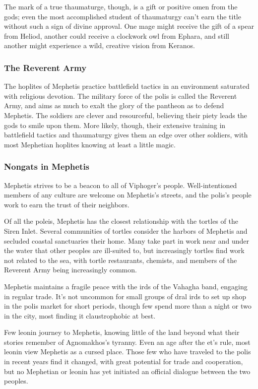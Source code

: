         The mark of a true thaumaturge, though, is a gift or positive omen from the gods; even the most accomplished student of thaumaturgy can't earn the title without such a sign of divine approval.
        One mage might receive the gift of a spear from Heliod, another could receive a clockwork owl from Ephara, and still another might experience a wild, creative vision from Keranos.

    \subsubsection{The Reverent Army}
        The hoplites of Mephetis practice battlefield tactics in an environment saturated with religious devotion.
        The military force of the polis is called the Reverent Army, and aims as much to exalt the glory of the pantheon as to defend Mephetis.
        The soldiers are clever and resourceful, believing their piety leads the gods to smile upon them.
        More likely, though, their extensive training in battlefield tactics and thaumaturgy gives them an edge over other soldiers, with most Mephetian hoplites knowing at least a little magic.

    \subsubsection{Nongats in Mephetis}
        Mephetis strives to be a beacon to all of Viphoger's people.
        Well-intentioned members of any culture are welcome on Mephetis's streets, and the polis's people work to earn the trust of their neighbors.

        Of all the poleis, Mephetis has the closest relationship with the tortles of the Siren Inlet.
        Several communities of tortles consider the harbors of Mephetis and secluded coastal sanctuaries their home.
        Many take part in work near and under the water that other peoples are ill-suited to, but increasingly tortles find work not related to the sea, with tortle restaurants, chemists, and members of the Reverent Army being increasingly common.

        Mephetis maintains a fragile peace with the irds of the Vahagha band, engaging in regular trade.
        It's not uncommon for small groups of dral irds to set up shop in the polis market for short periods, though few spend more than a night or two in the city, most finding it claustrophobic at best.

        Few leonin journey to Mephetis, knowing little of the land beyond what their stories remember of Agnomakhos's tyranny.
        Even an age after the et's rule, most leonin view Mephetis as a cursed place.
        Those few who have traveled to the polis in recent years find it changed, with great potential for trade and cooperation, but no Mephetian or leonin has yet initiated an official dialogue between the two peoples.

